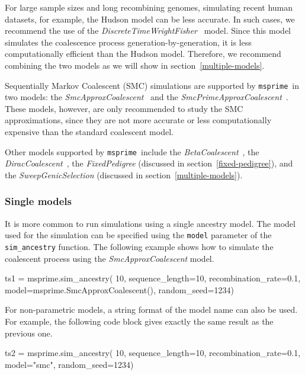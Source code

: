 \documentclass[graybox]{svmult}
\newcommand{\msprime}[0]{\texttt{msprime}}
\begin{document}
For large sample sizes and long recombining genomes, simulating recent human datasets, for example, the Hudson model can be
less accurate. In such cases, we recommend the use of the \emph{DiscreteTimeWrightFisher}~\citep{nelson2020accounting} model.
Since this model simulates the coalescence process generation-by-generation, it is less computationally efficient than the
Hudson model. Therefore, we recommend combining the two models as we will show in section~\ref{multiple-models}.

Sequentially Markov Coalescent (SMC) simulations are supported by \msprime\ in two models: the \emph{SmcApproxCoalescent}~\citep{mcvean2005approximating}
and the \emph{SmcPrimeApproxCoalescent}~\citep{marjoram2006fast}. These models, however, are only
recommended to study the SMC approximations, since they are not more accurate or less computationally expensive than the standard coalescent model.

Other models supported by \msprime\ include the \emph{BetaCoalescent}~\citep{schweinsberg03}, the \emph{DiracCoalescent}~\citep{BBE13},
the \emph{FixedPedigree} (discussed in section~\ref{fixed-pedigree}), and the \emph{SweepGenicSelection} (discussed in section~\ref{multiple-models}).


\subsubsection{Single models}\label{single-models}

It is more common to run simulations using a single ancestry model. The model used for the simulation can be specified using the \texttt{model} parameter
of the \texttt{sim\_ancestry} function. The following example shows how to simulate the coalescent process using the \emph{SmcApproxCoalescent} model.

\begin{pythoncode}
ts1 = msprime.sim_ancestry(
    10,
    sequence_length=10,
    recombination_rate=0.1,
    model=msprime.SmcApproxCoalescent(),
    random_seed=1234)
\end{pythoncode}

For non-parametric models, a string format of the model name can also be used. For example, the following code block gives exactly the
same result as the previous one.

\begin{pythoncode}
ts2 = msprime.sim_ancestry(
    10,
    sequence_length=10,
    recombination_rate=0.1,
    model="smc",
    random_seed=1234)
\end{pythoncode}
\end{document}
